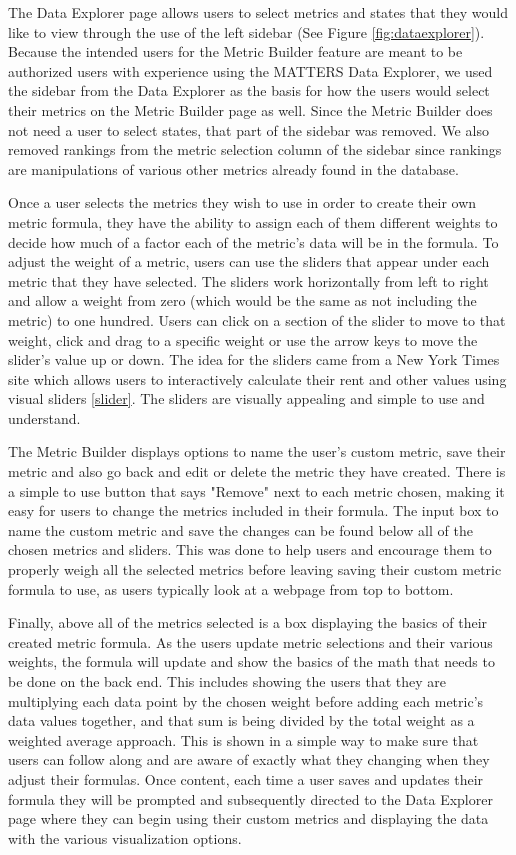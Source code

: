 			The Data Explorer page allows users to select metrics and states that they would like to view through the use of the left sidebar (See Figure \ref{fig:dataexplorer}). 
			Because the intended users for the Metric Builder feature are meant to be authorized users with 
			experience using the MATTERS Data Explorer, we used the sidebar from the Data Explorer as the 
			basis for how the users would select their metrics on the Metric Builder page as well. Since the Metric Builder does not need a user to select states, 
			that part of the sidebar was removed. We also removed rankings from the metric selection column of the sidebar since rankings are manipulations of 
			various other metrics already found in the database. 
			
			Once a user selects the metrics they wish to use in order to create their own metric formula, they have the ability to assign each of them different weights 
			to decide how much of a factor each of the metric's data will be in the formula. To adjust the weight of a metric, users can use the sliders that appear under 
			each metric that they have selected. The sliders work horizontally from left to right and allow a weight from zero (which would be the same as not including the metric) 
			to one hundred. Users can click on a section of the slider to move to that weight, click and drag to a specific weight or use the arrow keys to move the slider's value up or down. 
			The idea for the sliders came from a New York Times site which allows users to interactively calculate their rent and other values using visual sliders \ref{slider}. The sliders are 
			visually appealing and simple to use and understand.
			
			The Metric Builder displays options to name the user's custom metric, save their metric and also go back and edit or delete the metric they have created. There is a 
			simple to use button that says "Remove" next to each metric chosen, making it easy for users to change the metrics included in their formula. The input 
			box to name the custom metric and save the changes can be found below all of the chosen metrics and sliders. This was done to help users and encourage them to 
			properly weigh all the selected metrics before leaving saving their custom metric formula to use, as users typically look at a webpage from top to bottom.
		
			Finally, above all of the metrics selected is a box displaying the basics of their created metric formula. As the users update metric selections and their various weights,
			the formula will update and show the basics of the math that needs to be done on the back end. This includes showing the users that they are 
			multiplying each data point by the chosen weight before adding each metric's data values together, and that sum is being divided by the total weight as a weighted average approach. 
			This is shown in a simple way to make sure that users can follow along and are aware of exactly what they changing when they adjust their formulas. 
			Once content, each time a user saves and updates their formula they will be prompted and subsequently directed to the Data Explorer page where they can begin using their custom metrics and displaying the data with the various visualization options.
			

